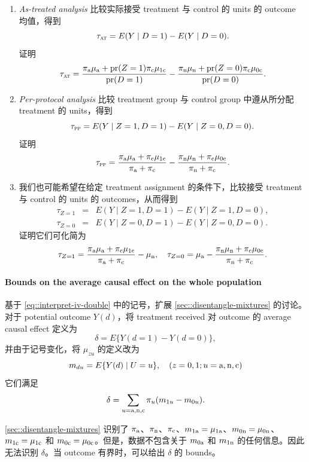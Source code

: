 \begin{enumerate}
\item 
{\it As-treated analysis} 比较实际接受 treatment 与 control 的 units 的 outcome 均值，得到
$$
\tau_\textsc{at} = E(Y\mid D=1) - E(Y\mid D=0).
$$
证明
$$
\tau_\textsc{at} = \frac{  \pi_{\textup{a}} \mu_{\textup{a}} + \textup{pr}(Z=1)\pi_{\textup{c}} \mu_{1\textup{c}}   }{   \textup{pr}(D=1) } 
- \frac{  \pi_{\textup{n}} \mu_{\textup{n}} + \textup{pr}(Z=0) \pi_{\textup{c}} \mu_{0\textup{c}}   }{   \textup{pr}(D=0) } .
$$


\item 
{\it Per-protocol analysis} 比较 treatment group 与 control group 中遵从所分配 treatment 的 units，得到
$$
\tau_\textsc{pp} = E(Y\mid Z=1, D=1) - E(Y\mid Z=0, D=0).
$$
证明
$$
\tau_\textsc{pp} =\frac{  \pi_{\textup{a}} \mu_{\textup{a}} + \pi_{\textup{c}} \mu_{1\textup{c}} }{  \pi_{\textup{a}}   + \pi_{\textup{c}} }
- \frac{  \pi_{\textup{n}} \mu_{\textup{n}} + \pi_{\textup{c}} \mu_{0\textup{c}} }{  \pi_{\textup{n}}   + \pi_{\textup{c}} }.
$$


\item 
我们也可能希望在给定 treatment assignment 的条件下，比较接受 treatment 与 control 的 units 的 outcomes，从而得到
\begin{eqnarray*}
\tau_{Z=1} &=& E(Y\mid Z=1, D=1) - E(Y\mid Z=1, D=0),\\ 
\tau_{Z=0} &=& E(Y\mid Z=0, D=1) - E(Y\mid Z=0, D=0).
\end{eqnarray*}
证明它们可化简为
$$
\tau_{Z=1}  = \frac{  \pi_{\textup{a}} \mu_{\textup{a}} + \pi_{\textup{c}} \mu_{1\textup{c}} }{  \pi_{\textup{a}}   + \pi_{\textup{c}} } - \mu_{\textup{n}},\quad
\tau_{Z=0} = \mu_{\textup{a}} - \frac{  \pi_{\textup{n}} \mu_{\textup{n}} + \pi_{\textup{c}} \mu_{0\textup{c}} }{  \pi_{\textup{n}}   + \pi_{\textup{c}} }.
$$
\end{enumerate}
 
 
\paragraph{Bounds on the average causal effect on the whole population}\label{para::bounds-ACE}


基于 \cref{eq::interpret-iv-double} 中的记号，扩展 \cref{sec::disentangle-mixtures} 的讨论。对于 potential outcome $Y(d)$，将 treatment received 对 outcome 的 average causal effect 定义为
$$
\delta = E\{  Y(d=1) - Y(d=0) \},
$$
并由于记号变化，将 $\mu_{zu} $ 的定义改为
$$
m_{du} = E\{  Y(d) \mid U = u\},\quad  (z=0,1;u=\textup{a}, \textup{n}, \textup{c}) 
$$  
它们满足
$$
\delta = \sum_{u = \textup{a}, \textup{n}, \textup{c}}  \pi_u  (m_{1u} - m_{0u}).
$$

\cref{sec::disentangle-mixtures} 识别了 $\pi_{\textup{a}}$、$\pi_{\textup{n}}$、$\pi_{\textup{c}}$、$m_{1\textup{a}} = \mu_{1 \textup{a}}$、$m_{0\textup{n}} = \mu_{0\textup{n} }$、$m_{1\textup{c}} = \mu_{1\textup{c}}$ 和 $m_{0\textup{c}} = \mu_{0\textup{c}}$。但是，数据不包含关于 $m_{0 \textup{a}}$ 和 $m_{1\textup{n} }$ 的任何信息。因此无法识别 $\delta$。当 outcome 有界时，可以给出 $\delta$ 的 bounds。


